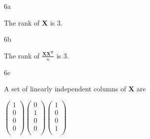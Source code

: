 \documentclass{article}
\begin{document}
\begin{homeworkProblem}

    \begin{homeworkSection}{6a}

        The rank of $\bm{X}$ is 3. 

    \end{homeworkSection}
        

    \begin{homeworkSection}{6b}
        
        The rank of $\frac{\bm{XX^T}}{n}$ is 3. 

    \end{homeworkSection}
    
    \begin{homeworkSection}{6c}

        A set of linearly independent columns of $\bm{X}$ are

        \begin{math}
             \left(\begin{matrix} 1\\0\\0\\0\\ \end{matrix}\right) 
             \left(\begin{matrix} 0\\1\\0\\0\\ \end{matrix}\right) 
             \left(\begin{matrix} 1\\0\\0\\1\\ \end{matrix}\right) 
        \end{math}

    \end{homeworkSection}

\end{homeworkProblem}
\end{document}

